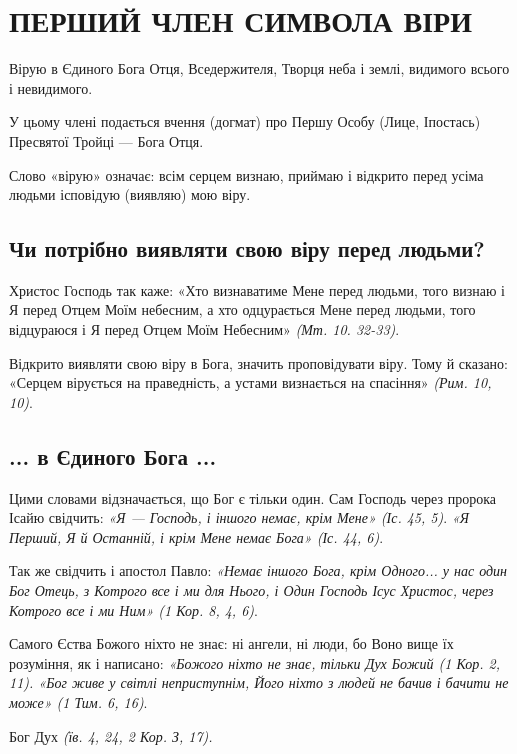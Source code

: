 \documentclass[main.tex]{subfiles}
\begin{document}
\section{ПЕРШИЙ ЧЛЕН СИМВОЛА ВІРИ}

\begin{FlushRight}
    Вірую в Єдиного Бога Отця, Вседержителя, Творця неба і землі, видимого всього і невидимого.
\end{FlushRight}

У цьому члені подається вчення (догмат) про Першу Особу (Лице, Іпостась) Пресвятої Тройці — Бога Отця.

Слово «вірую» означає: всім серцем визнаю, приймаю і відкрито перед усіма людьми ісповідую (виявляю) мою віру.

\subsection{Чи потрібно виявляти свою віру перед людьми?}

Христос Господь так каже: «Хто визнаватиме Мене перед людьми, того визнаю і Я перед Отцем Моїм небесним, а хто одцурається Мене перед людьми, того відцураюся і Я перед Отцем Моїм Небесним» \emph{(Мт. 10. 32-33)}.

Відкрито виявляти свою віру в Бога, значить проповідувати віру. Тому й сказано: «Серцем вірується на праведність, а устами визнається на спасіння» \emph{(Рим. 10, 10)}.
 
\subsection{... в Єдиного Бога ...}

Цими словами відзначається, що Бог є тільки один. Сам Господь через пророка Ісайю свідчить: \emph{{\color{red} «Я — Господь, і іншого немає, крім Мене»} (Іс. 45, 5)}. \emph{{\color{red} «Я Перший, Я й Останній, і крім Мене немає Бога»} (Іс. 44, 6)}.

Так же свідчить і апостол Павло: \emph{«Немає іншого Бога, крім Одного... у нас один Бог Отець, з Котрого все і ми для Нього, і Один Господь Ісус Христос, через Котрого все і ми Ним» (1 Кор. 8, 4, 6)}.

Самого Єства Божого ніхто не знає: ні ангели, ні люди, бо Воно вище їх розуміння, як і написано: \emph{«Божого ніхто не знає, тільки Дух Божий (1 Кор. 2, 11). «Бог живе у світлі неприступнім, Його ніхто з людей не бачив і бачити не може» (1 Тим. 6, 16)}.

Бог Дух \emph{(їв. 4, 24, 2 Кор. З, 17).}
\end{document}
